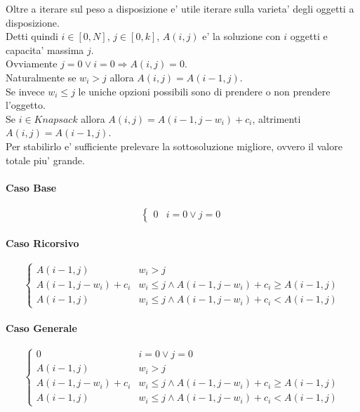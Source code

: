 Oltre a iterare sul peso a disposizione e' utile iterare sulla varieta' degli oggetti a disposizione. \\

Detti quindi $i \in [0, N]$, $j \in [0, k]$, $A(i, j)$ e' la soluzione con $i$ oggetti e capacita' massima $j$. \\
Ovviamente $j = 0 \lor i = 0 \Rightarrow A(i, j) = 0$. \\
Naturalmente se $w_i > j$ allora $A(i, j) = A(i - 1, j)$. \\
Se invece $w_i \leq j$ le uniche opzioni possibili sono di prendere o non prendere l'oggetto. \\
Se $i \in Knapsack$ allora $A(i, j) = A(i - 1, j - w_i) + c_i$, altrimenti $A(i, j) = A(i - 1, j)$. \\
Per stabilirlo e' sufficiente prelevare la sottosoluzione migliore, ovvero il valore totale piu' grande.

\paragraph{Caso Base}

\[
    \begin{cases}
        \text{$0$} & \text{$i = 0 \lor j = 0$}
    \end{cases}
\]

\paragraph{Caso Ricorsivo}

\[
    \begin{cases}
        \text{$A(i - 1, j)$} & \text{$w_i > j$} \\
        \text{$A(i - 1, j - w_i) + c_i$} & \text{$w_i \leq j \land A(i - 1, j - w_i) + c_i \geq A(i - 1, j)$} \\
        \text{$A(i - 1, j)$} & \text{$w_i \leq j \land A(i - 1, j - w_i) + c_i < A(i - 1, j)$}
    \end{cases}
\]

\paragraph{Caso Generale}

\[
    \begin{cases}
        \text{$0$} & \text{$i = 0 \lor j = 0$} \\
        \text{$A(i - 1, j)$} & \text{$w_i > j$} \\
        \text{$A(i - 1, j - w_i) + c_i$} & \text{$w_i \leq j \land A(i - 1, j - w_i) + c_i \geq A(i - 1, j)$} \\
        \text{$A(i - 1, j)$} & \text{$w_i \leq j \land A(i - 1, j - w_i) + c_i < A(i - 1, j)$}
    \end{cases}
\]

